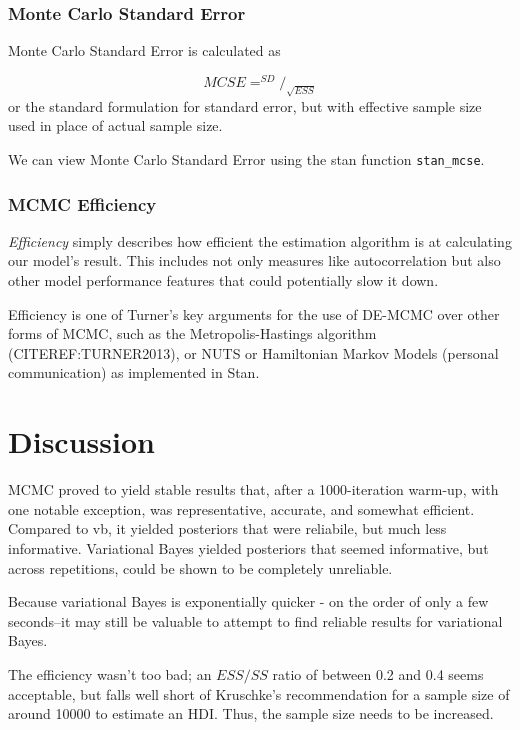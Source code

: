 \documentclass[]{article}
\begin{document}
\subsubsection{Monte Carlo Standard
Error}\label{monte-carlo-standard-error}

Monte Carlo Standard Error is calculated as

\[MCSE= ^{SD}/_{\sqrt{ESS}}\] or the standard formulation for standard
error, but with effective sample size used in place of actual sample
size.

We can view Monte Carlo Standard Error using the stan function
\texttt{stan\_mcse}.

\subsubsection{MCMC Efficiency}\label{mcmc-efficiency}

\emph{Efficiency} simply describes how efficient the estimation
algorithm is at calculating our model's result. This includes not only
measures like autocorrelation but also other model performance features
that could potentially slow it down.

Efficiency is one of Turner's key arguments for the use of DE-MCMC over
other forms of MCMC, such as the Metropolis-Hastings algorithm
(CITEREF:TURNER2013), or NUTS or Hamiltonian Markov Models (personal
communication) as implemented in Stan.

\section{Discussion}\label{discussion}

MCMC proved to yield stable results that, after a 1000-iteration
warm-up, with one notable exception, was representative, accurate, and
somewhat efficient. Compared to vb, it yielded posteriors that were
reliabile, but much less informative. Variational Bayes yielded
posteriors that seemed informative, but across repetitions, could be
shown to be completely unreliable.

Because variational Bayes is exponentially quicker - on the order of
only a few seconds--it may still be valuable to attempt to find reliable
results for variational Bayes.

The efficiency wasn't too bad; an \(ESS/SS\) ratio of between 0.2 and
0.4 seems acceptable, but falls well short of Kruschke's recommendation
for a sample size of around 10000 to estimate an HDI. Thus, the sample
size needs to be increased.
\end{document}
